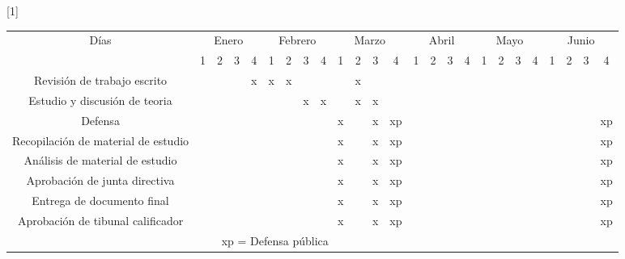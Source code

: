 \begin{table}[h]
   \centering
   \scalebox{0.8}[1]{
   \begin{tabular}{| c | c | c | c | c | c | c | c | c | c | c | c | c | c | c | c | c | c | c | c | c | c | c | c | c |}\hline
      \multirow{2}{2cm}{D\'ias} &  \multicolumn{4}{c}{Enero} & \multicolumn{4}{|c|}{Febrero}  & \multicolumn{4}{|c|}{Marzo}  &  \multicolumn{4}{|c|}{Abril} & \multicolumn{4}{|c|}{Mayo} & \multicolumn{4}{|c|}{Junio}\\ \cline{2-25}  
                                             & 1 & 2 & 3 & 4 & 1 & 2 & 3 & 4 & 1 & 2 & 3 & 4 & 1 & 2 & 3 & 4 & 1 & 2 & 3 & 4 & 1 & 2 & 3 & 4 \\ \hline
      Revisi\'on de trabajo escrito          &   &   &   & x & x & x &   &   &   & x &   &   &   &   &   &   &   &   &   &   &   &   &   &   \\ \hline
      Estudio y discusi\'on de teoria        &   &   &   &   &   &   & x & x &   & x & x &   &   &   &   &   &   &   &   &   &   &   &   &   \\ \hline
      Defensa                                &   &   &   &   &   &   &   &   & x &   & x & xp&   &   &   &   &   &   &   &   &   &   &   & xp  \\ \hline
      Recopilaci\'on de material de estudio  &   &   &   &   &   &   &   &   & x &   & x & xp&   &   &   &   &   &   &   &   &   &   &   & xp  \\ \hline
      An\'alisis de material de estudio      &   &   &   &   &   &   &   &   & x &   & x & xp&   &   &   &   &   &   &   &   &   &   &   & xp  \\ \hline
      Aprobaci\'on de junta directiva        &   &   &   &   &   &   &   &   & x &   & x & xp&   &   &   &   &   &   &   &   &   &   &   & xp  \\ \hline
      Entrega de documento final             &   &   &   &   &   &   &   &   & x &   & x & xp&   &   &   &   &   &   &   &   &   &   &   & xp  \\ \hline
      Aprobaci\'on de tibunal calificador    &   &   &   &   &   &   &   &   & x &   & x & xp&   &   &   &   &   &   &   &   &   &   &   & xp  \\ \hline

      \multicolumn{21}{c}{xp = Defensa p\'ublica}
   \end{tabular}
}
\end{table}
  


